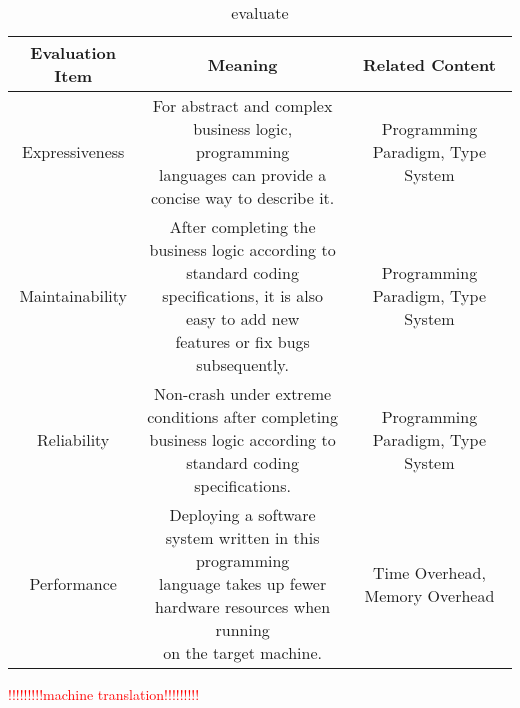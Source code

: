 \begin{table*}[ht]
    \caption{evaluate}
    \label{tab:evaluate}
    \begin{center}
        \begin{tabular}{ccc}
            \toprule
            Evaluation Item & Meaning & Related Content \\
            \midrule
            Expressiveness &
            \makecell[l]{
                For abstract and complex business logic, programming \\
                languages can provide a concise way to describe it.
            }
            & Programming Paradigm, Type System \\
            \midrule
            Maintainability &
            \makecell[l]{
                After completing the business logic according to \\
                standard coding specifications, it is also easy to add new \\ features or
                fix bugs subsequently.
            }
            & Programming Paradigm, Type System \\
            \midrule
            Reliability &
            \makecell[l]{
                Non-crash under extreme conditions after completing \\
                business logic according to standard coding specifications.
            }
            & Programming Paradigm, Type System \\
            \midrule
            Performance &
            \makecell[l]{
                Deploying a software system written in this programming \\
                language takes up fewer hardware resources when running \\ on the target
                machine.
            }
            & Time Overhead, Memory Overhead \\
            \bottomrule
        \end{tabular}
    \end{center}
\end{table*}

\textcolor{red}{!!!!!!!!!machine translation!!!!!!!!!}

